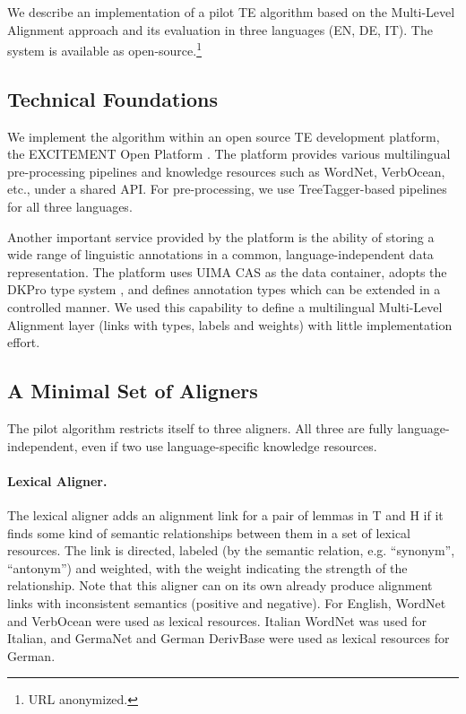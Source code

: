 \documentclass[11pt,a4paper]{article}
\begin{document}
We describe an implementation of a pilot TE algorithm based on the
Multi-Level Alignment approach and its evaluation in three languages
(EN, DE, IT). The system is available as open-source.\footnote{{URL}
  anonymized.}


\subsection{Technical Foundations}  
\label{sec:techn-found}

We implement the algorithm within an open source TE development
platform, the EXCITEMENT Open Platform \cite{EOP-arch}. The platform
provides various multilingual pre-processing pipelines and knowledge
resources such as WordNet, VerbOcean, etc., under a shared API. For
pre-processing, we use TreeTagger-based pipelines for all three
languages.

Another important service provided by the platform is the
ability of storing a wide range of linguistic annotations in a common,
language-independent data representation. The platform uses UIMA CAS
\cite{d04:_uima} as the data container, adopts the DKPro type system
\cite{DKpro}, and defines annotation types which can be extended in a
controlled manner. We used this capability to define a multilingual
Multi-Level Alignment layer  (links with types, labels and weights)
with little implementation effort.

\subsection{A Minimal Set of Aligners}

The pilot algorithm restricts itself to three aligners.  All three are
fully language-independent, even if two use
language-specific knowledge resources.

\paragraph{Lexical Aligner.} The lexical aligner adds an alignment link
for a pair of lemmas in T and H if it finds some kind of semantic
relationships between them in a set of lexical resources. The link is
directed, labeled (by the semantic relation, e.g. ``synonym'',
``antonym'') and weighted, with the weight indicating the strength of
the relationship. Note that this aligner can on its own already
produce alignment links with inconsistent semantics (positive and
negative). For English, WordNet and VerbOcean were used as lexical
resources. Italian WordNet was used for Italian, and GermaNet and
German DerivBase \cite{Zeller:2013} were used as lexical resources for
German.
\end{document}
